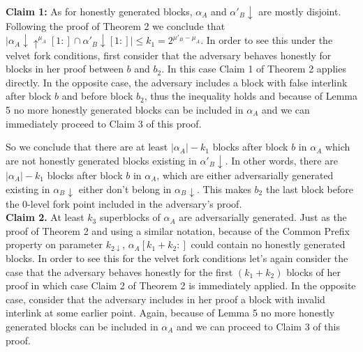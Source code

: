 \textbf{Claim 1:} As for honestly generated blocks, $\alpha_A$ and
$\alpha'_B\downarrow$ are mostly disjoint. Following the proof of Theorem 2
we conclude that $\vert \alpha_A\downarrow\uparrow^{\mu_A}[1:] \cap
\alpha'_B\downarrow[1:] \vert \leq k_{1} = 2^{\mu'_B - \mu_A}$. In order to see
this under the velvet fork conditions, first consider that the adversary behaves
honestly for blocks in her proof between $b$ and $b_2$. In this case Claim 1 of
Theorem 2 applies directly. In the opposite case, the adversary includes a block
with false interlink after block $b$ and before block $b_2$, thus the inequality
holds and because of Lemma 5 no more honestly generated blocks can be included
in $\alpha_A$ and we can immediately proceed to Claim 3 of this proof.

So we conclude that there are at least $\vert \alpha_A \vert - k_1$ blocks after
block $b$ in $\alpha_A$ which are not honestly generated blocks existing in
$\alpha'_B\downarrow$. In other words, there are $\vert \alpha_A \vert - k_1$
blocks after block $b$ in $\alpha_A$, which are either adversarially generated
existing in $\alpha_B\downarrow$ either don't belong in $\alpha_B\downarrow$.
This makes $b_2$ the last block before the 0-level fork point included in the
adversary's proof.\\

\textbf{Claim 2.} 
At least $k_3$ superblocks of $\alpha_A$ are adversarially generated. Just as
the proof of Theorem 2 and using a similar notation, because of the Common Prefix
property on parameter $k_{2\downarrow}$, $\alpha_A[k_{1}+k_{2}:]$ could contain
no honestly generated blocks. In order to see this for the velvet fork conditions
let's again consider the case that the adversary behaves honestly for the first
$(k_1 + k_2)$ blocks of her proof in which case Claim 2 of Theorem 2 is immediately
applied. In the opposite case, consider that the adversary includes in her proof a
block with invalid interlink at some earlier point. Again, because of Lemma 5 no more
honestly generated blocks can be included in $\alpha_A$ and we can proceed to Claim 3
of this proof.\\


